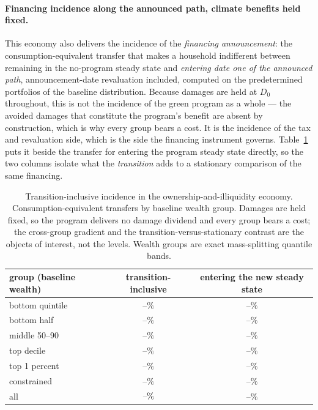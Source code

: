 \documentclass[12pt]{article}
\providecommand{\pendingnum}{\textit{--}}
\providecommand{\KVWelBot}{\pendingnum}\providecommand{\KVWelBotSS}{\pendingnum}
\providecommand{\KVWelHalf}{\pendingnum}\providecommand{\KVWelHalfSS}{\pendingnum}
\providecommand{\KVWelMid}{\pendingnum}\providecommand{\KVWelMidSS}{\pendingnum}
\providecommand{\KVWelTop}{\pendingnum}\providecommand{\KVWelTopSS}{\pendingnum}
\providecommand{\KVWelTopOne}{\pendingnum}\providecommand{\KVWelTopOneSS}{\pendingnum}
\providecommand{\KVWelCon}{\pendingnum}\providecommand{\KVWelConSS}{\pendingnum}
\providecommand{\KVWelAllSS}{\pendingnum}\providecommand{\KVWelMaxGap}{\pendingnum}
\begin{document}
\paragraph{Financing incidence along the announced path, climate benefits
held fixed.} This economy also delivers the incidence of the
\emph{financing announcement}: the consumption-equivalent transfer that
makes a household indifferent between remaining in the no-program steady
state and \emph{entering date one of the announced path}, announcement-date
revaluation included, computed on the predetermined portfolios of the
baseline distribution. Because damages are held at $D_0$ throughout, this
is not the incidence of the green program as a whole --- the avoided
damages that constitute the program's benefit are absent by construction,
which is why every group bears a cost. It is the incidence of the tax and
revaluation side, which is the side the financing instrument governs.
Table~\ref{tab:kvwel} puts it beside the transfer for entering the program
steady state directly, so the two columns isolate what the \emph{transition}
adds to a stationary comparison of the same financing.

\begin{table}[htbp]\centering
\caption{Transition-inclusive incidence in the ownership-and-illiquidity
economy. Consumption-equivalent transfers by baseline wealth group.
Damages are held fixed, so the program delivers no damage dividend and
every group bears a cost; the cross-group gradient and the
transition-versus-stationary contrast are the objects of interest, not the
levels. Wealth groups are exact mass-splitting quantile bands.}
\label{tab:kvwel}
\begin{tabular}{lcc}
\hline\hline
group (baseline wealth) & transition-inclusive & entering the new steady state \\
\hline
bottom quintile   & $\KVWelBot\%$    & $\KVWelBotSS\%$ \\
bottom half       & $\KVWelHalf\%$   & $\KVWelHalfSS\%$ \\
middle 50--90     & $\KVWelMid\%$    & $\KVWelMidSS\%$ \\
top decile        & $\KVWelTop\%$    & $\KVWelTopSS\%$ \\
top 1 percent     & $\KVWelTopOne\%$ & $\KVWelTopOneSS\%$ \\
constrained       & $\KVWelCon\%$    & $\KVWelConSS\%$ \\
all               & $\KVWelAll\%$    & $\KVWelAllSS\%$ \\
\hline\hline
\end{tabular}
\end{table}
\end{document}
